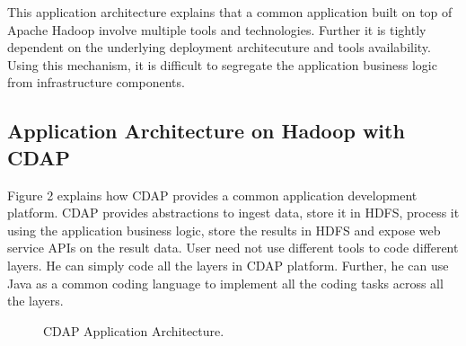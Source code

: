 \documentclass[9pt,twocolumn,twoside]{styles/osajnl}
\begin{document}
This application architecture explains that a common application built on top
 of Apache Hadoop involve multiple tools and technologies. Further it is
 tightly dependent on the underlying deployment architecuture and tools
 availability. Using this mechanism, it is difficult to segregate the
 application business logic from infrastructure components.

\subsection{Application Architecture on Hadoop with CDAP}
Figure 2 \cite{www-cdap-architecture} explains how CDAP provides a common
application development platform. CDAP provides abstractions to ingest data,
store it in HDFS, process it using the application business logic, store the
results in HDFS and expose web service APIs on the result data. User need not
 use different tools to code different layers. He can simply code all the
 layers in CDAP platform. Further, he can use Java as a common coding
 language to implement all the coding tasks across all the layers.

\begin{figure}[htbp]
\centering
{}
\caption{CDAP Application Architecture.}
\label{fig:CDAP Architecture}
\end{figure}
\end{document}
